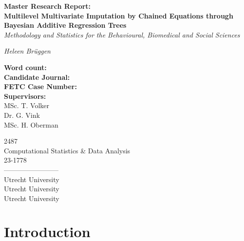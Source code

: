 \documentclass[10pt, a4paper, titlepage]{article}
\begin{document}
\begin{titlingpage}
\begin{center}
\Huge\textbf{Master Research Report:  \\ Multilevel Multivariate Imputation by Chained Equations through Bayesian Additive Regression Trees} \\
\Large\textit{Methodology and Statistics for the Behavioural, Biomedical and Social Sciences}

\vspace{.5cm}

\normalsize\textit{Heleen Brüggen}

\vspace{15cm}

\begin{minipage}{0.5\textwidth}
\begin{flushleft}

\textbf{Word count:} \\
\textbf{Candidate Journal:} \\
\textbf{FETC Case Number:} \\
\textbf{Supervisors:} \\
MSc. T. Volker \\
Dr. G. Vink \\
MSc. H. Oberman
\end{flushleft}
\end{minipage}%
\begin{minipage}{0.5\textwidth}
\begin{flushright}

2487 \\
Computational Statistics \& Data Analysis \\
23-1778 \\
------------------------\\
Utrecht University \\
Utrecht University \\
Utrecht University
\end{flushright}
\end{minipage}

\end{center}
\end{titlingpage}

\newpage

\section{Introduction}
\end{document}
